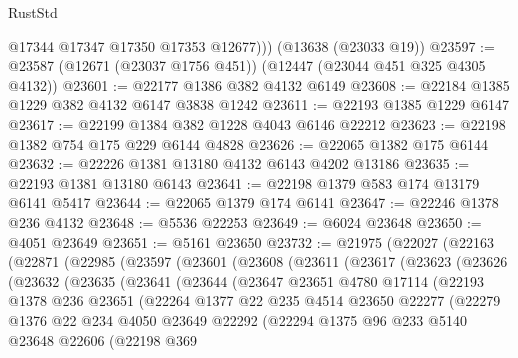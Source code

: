 \begin{lexlean}{RustStd}
\begin{coremodule}
          @17344
          @17347
          @17350
          @17353
          @12677)))
    (@13638 (@23033 @19))
@23597 := @23587 (@12671 (@23037 @1756 @451)) (@12447 (@23044 @451 @325 @4305 @4132))
@23601 := @22177 @1386 @382 @4132 @6149
@23608 := @22184 @1385 @1229 @382 @4132 @6147 @3838 @1242
@23611 := @22193 @1385 @1229 @6147
@23617 := @22199 @1384 @382 @1228 @4043 @6146 @22212
@23623 := @22198 @1382 @754 @175 @229 @6144 @4828
@23626 := @22065 @1382 @175 @6144
@23632 := @22226 @1381 @13180 @4132 @6143 @4202 @13186
@23635 := @22193 @1381 @13180 @6143
@23641 := @22198 @1379 @583 @174 @13179 @6141 @5417
@23644 := @22065 @1379 @174 @6141
@23647 := @22246 @1378 @236 @4132
@23648 := @5536 @22253
@23649 := @6024 @23648
@23650 := @4051 @23649
@23651 := @5161 @23650
@23732 := @21975
    (@22027
      (@22163
        (@22871
          (@22985
            (@23597
              (@23601
                (@23608
                  (@23611
                    (@23617
                      (@23623
                        (@23626
                          (@23632
                            (@23635
                              (@23641
                                (@23644
                                  (@23647
                                    @23651
                                    @4780
                                    @17114
                                    (@22193
                                      @1378
                                      @236
                                      @23651
                                      (@22264
                                        @1377
                                        @22
                                        @235
                                        @4514
                                        @23650
                                        @22277
                                        (@22279
                                          @1376
                                          @22
                                          @234
                                          @4050
                                          @23649
                                          @22292
                                          (@22294
                                            @1375
                                            @96
                                            @233
                                            @5140
                                            @23648
                                            @22606
                                            (@22198
                                              @369

\end{coremodule}
\end{lexlean}
